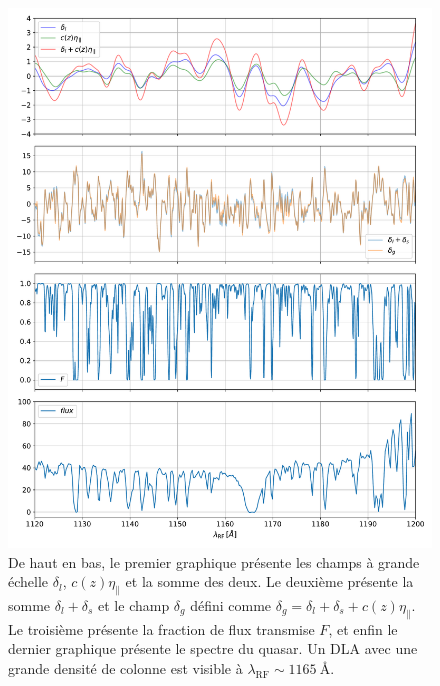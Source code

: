 \begin{figure}
  \centering
  \includegraphics[scale=0.6]{building_trans.pdf}
  \caption{
    De haut en bas, le premier graphique présente les champs à grande échelle $\delta_l$, $c(z)\eta_{\parallel}$ et la somme des deux. Le deuxième présente la somme $\delta_l + \delta_s$ et le champ $\delta_g$ défini comme $\delta_g = \delta_l + \delta_s + c(z) \eta_{\parallel}$. Le troisième présente la fraction de flux transmise $F$, et enfin le dernier graphique présente le spectre du quasar. Un DLA avec une grande densité de colonne est visible à $\lambda_{\mathrm{RF}} \sim \SI{1165}{\angstrom}$.
  }
  \label{fig:building_trans}
\end{figure}


